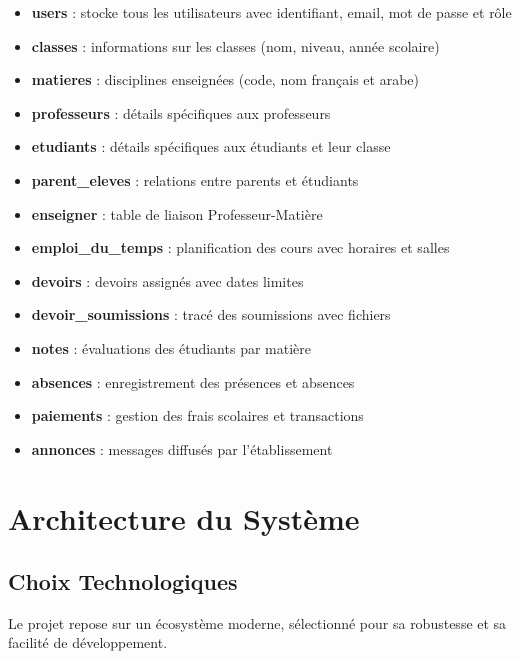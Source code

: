 \documentclass[12pt,a4paper]{report}
\begin{document}
    \begin{itemize}
        \item \textbf{users} : stocke tous les utilisateurs avec identifiant, email, mot de passe et rôle
        \item \textbf{classes} : informations sur les classes (nom, niveau, année scolaire)
        \item \textbf{matieres} : disciplines enseignées (code, nom français et arabe)
        \item \textbf{professeurs} : détails spécifiques aux professeurs
        \item \textbf{etudiants} : détails spécifiques aux étudiants et leur classe
        \item \textbf{parent\_eleves} : relations entre parents et étudiants
        \item \textbf{enseigner} : table de liaison Professeur-Matière
        \item \textbf{emploi\_du\_temps} : planification des cours avec horaires et salles
        \item \textbf{devoirs} : devoirs assignés avec dates limites
        \item \textbf{devoir\_soumissions} : tracé des soumissions avec fichiers
        \item \textbf{notes} : évaluations des étudiants par matière
        \item \textbf{absences} : enregistrement des présences et absences
        \item \textbf{paiements} : gestion des frais scolaires et transactions
        \item \textbf{annonces} : messages diffusés par l'établissement
    \end{itemize}


    \chapter{Architecture du Système}

    \section{Choix Technologiques}

    Le projet repose sur un écosystème moderne, sélectionné pour sa robustesse et sa facilité de développement.
\end{document}
